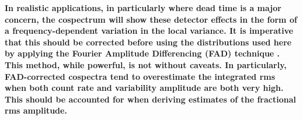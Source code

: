 \documentclass[12pt]{emulateapj}
\begin{document}
\textbf{In realistic applications, in particularly where dead time is a major concern, the cospectrum will show these detector effects in the form of a frequency-dependent variation in the local variance. It is imperative that this should be corrected before using the distributions used here by applying the Fourier Amplitude Differencing (FAD) technique \citep{bachetti2017}. This method, while powerful, is not without caveats. In particularly, FAD-corrected cospectra tend to overestimate the integrated rms when both count rate and variability amplitude are both very high. This should be accounted for when deriving estimates of the fractional rms amplitude.}

\end{document}
